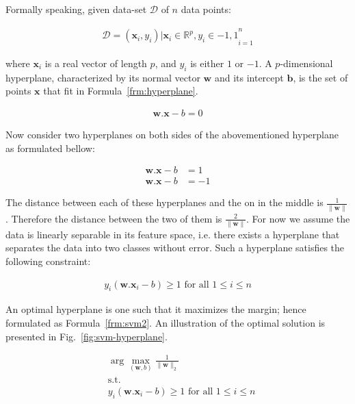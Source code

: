 Formally speaking, given data-set $\mathcal{D}$ of $n$ data points:

\begin{align}
  \mathcal{D}={(\mathbf{x}_i, y_i) | \mathbf{x}_i \in \mathbb{R}^p, y_i \in {-1, 1}}_{i=1}^{n}
\end{align}

where $\mathbf{x}_i$ is a real vector of length $p$, and $y_i$ is either $1$ or $-1$. A $p$-dimensional hyperplane, characterized by its normal vector $\mathbf{w}$ and its intercept $\mathbf{b}$, is the set of points $\mathbf{x}$ that fit in Formula~\ref{frm:hyperplane}.

\begin{align}
  \mathbf{w} . \mathbf{x} - b = 0
  \label{frm:hyperplane}
\end{align}

Now consider two hyperplanes on both sides of the abovementioned hyperplane as formulated bellow:

\begin{align}
  \mathbf{w} . \mathbf{x} - b &= 1 \nonumber \\
  \mathbf{w} . \mathbf{x} - b &= -1
\end{align}

The distance between each of these hyperplanes and the on in the middle is $\frac{1}{\parallel \mathbf{w} \parallel}$. Therefore the distance between the two of them is $\frac{2}{\parallel \mathbf{w} \parallel}$. For now we assume the data is linearly separable in its feature space, i.e. there exists a hyperplane that separates the data into two classes without error. Such a hyperplane satisfies the following constraint:

\begin{align}
  y_i (\mathbf{w} . \mathbf{x}_i - b)\geq 1 \text{ for all } 1 \leq i \leq n
\end{align}

An optimal hyperplane is one such that it maximizes the margin; hence formulated as Formula~\ref{frm:svm2}. An illustration of the optimal solution is presented in Fig.~\ref{fig:svm-hyperplane}.

\begin{align}
  &\arg\max_{(\mathbf{w},b)}\frac{1}{\|\mathbf{w}\|_2} \nonumber \\
  &\text{s.t.} \nonumber \\
  &y_i (\mathbf{w} . \mathbf{x}_i - b)\geq 1 \text{ for all } 1 \leq i \leq n
  \label{frm:svm2}
\end{align}

